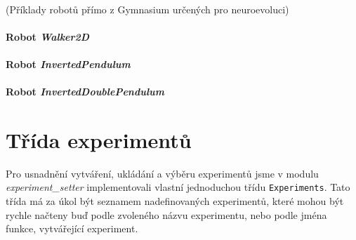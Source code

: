 \paragraph{}
(Příklady robotů přímo z Gymnasium určených pro neuroevoluci)
\paragraph{Robot \emph{Walker2D}} \label{imp:robots.Walker}


\paragraph{Robot \emph{InvertedPendulum}} \label{imp:robots.InvertedPendulum}


\paragraph{Robot \emph{InvertedDoublePendulum}} \label{imp:robots.InvertedDoublePendulum}


\section{Třída experimentů} \label{imp:experimentsetter}
Pro usnadnění vytváření, ukládání a výběru experimentů jsme v modulu
\emph{experiment\_setter} implementovali vlastní jednoduchou třídu
\texttt{Experiments}. Tato třída má za úkol být seznamem nadefinovaných
experimentů, které mohou být rychle načteny buď podle zvoleného názvu
experimentu, nebo podle jména funkce, vytvářející experiment.

